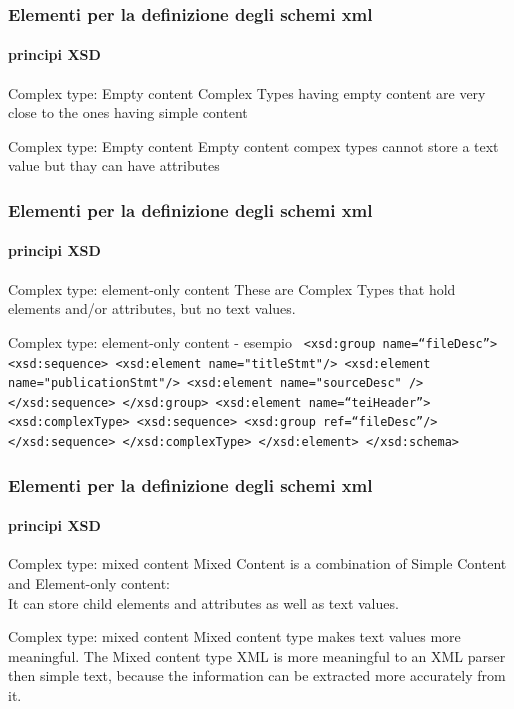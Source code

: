 \begin{frame}
	\frametitle{Elementi per la definizione degli schemi xml}
	\framesubtitle{principi XSD}
	\addtocounter{nframe}{1}

	\begin{block}{Complex type: Empty content}
		Complex Types having empty content are very close to the ones having simple content
	\end{block}

	\begin{block}{Complex type: Empty content}
		Empty content compex types cannot store a text value but thay can have attributes
	\end{block}
\end{frame}



\begin{frame}
	\frametitle{Elementi per la definizione degli schemi xml}
	\framesubtitle{principi XSD}
	\addtocounter{nframe}{1}

	\begin{block}{Complex type: element-only content}
		These are Complex Types that hold elements and/or attributes, but no text values.
	\end{block}

	\begin{block}{Complex type: element-only content - esempio}
		\texttt{
			<xsd:group name=``fileDesc''>
     <xsd:sequence>
       <xsd:element name="titleStmt"/>
	   <xsd:element name="publicationStmt"/>
	   <xsd:element name="sourceDesc" />
     </xsd:sequence>
   </xsd:group>
   <xsd:element name=``teiHeader''>
     <xsd:complexType>
       <xsd:sequence>
         <xsd:group ref=``fileDesc''/>
       </xsd:sequence>
     </xsd:complexType>
   </xsd:element>
 </xsd:schema>
		}
	\end{block}
\end{frame}

\begin{frame}
	\frametitle{Elementi per la definizione degli schemi xml}
	\framesubtitle{principi XSD}
	\addtocounter{nframe}{1}

	\begin{block}{Complex type: mixed content}
		Mixed Content is a combination of Simple Content and Element-only content:
		\\ It can store child elements and attributes as well as text values.
	\end{block}

	\begin{block}{Complex type: mixed content}
		 Mixed content type makes text values more meaningful. The Mixed content type XML is more meaningful to an XML parser then simple text, because the information can be extracted more accurately from it.
	\end{block}
\end{frame}


